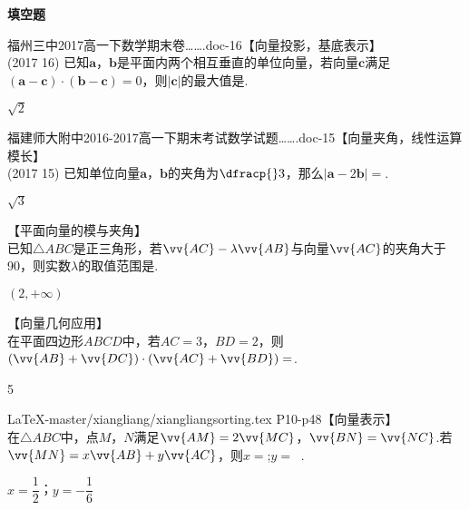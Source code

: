 \begin{exercise}{\bf 填空题}
    \item 福州三中2017高一下数学期末卷…….doc-16【向量投影，基底表示】\\
     (2017  16)
     已知$\bm a$，$\bm b$是平面内两个相互垂直的单位向量，若向量$\bm c$满足$(\bm a-\bm c)\cdot(\bm b-\bm c)=0$，则$|\bm c|$的最大值是\tk.
     \begin{answer}
       $\sqrt2$
     \end{answer}
    \item 福建师大附中2016-2017高一下期末考试数学试题…….doc-15【向量夹角，线性运算模长】\\
     (2017  15)
     已知单位向量$\bm a$，$\bm b$的夹角为$\dfracp{}3$，那么$|\bm a-2\bm b|=$\tk.
     \begin{answer}
       $\sqrt3$
     \end{answer}
    \item 【平面向量的模与夹角】\\
     已知$\triangle{ABC}$是正三角形，若$\vv{AC}-\lambda\vv{AB}$与向量$\vv{AC}$的夹角大于90\degree，则实数$\lambda$的取值范围是\tk.
     \begin{answer}
       $(2,+\infty)$
     \end{answer}
    \item 【向量几何应用】\\
     在平面四边形$ABCD$中，若$AC=3$，$BD=2$，则$(\vv{AB}+\vv{DC})\cdot(\vv{AC}+\vv{BD})=$\tk.
     \begin{answer}
       5
     \end{answer}
    \newline
    {\begin{minipage}[b]{0.65\linewidth}
      \item LaTeX-master/xiangliang/xiangliangsorting.tex P10-p48【向量表示】\\
      在$\triangle ABC$中，点$ M$，$N $满足$ \vv{AM}=2\vv{MC}$，$\vv{BN}=\vv{NC}$.若$\vv{MN}=x\vv{AB}+y\vv{AC}$，则$ x= $\tk;$ y= ~$ \tk.
      \begin{answer}
        $x=\dfrac12$；$y=-\dfrac16$
      \end{answer}
     \end{minipage}
     \begin{minipage}[htbp!]{0.3\linewidth}
       \begin{center}
\end{center}
\end{minipage}}
\end{exercise}
